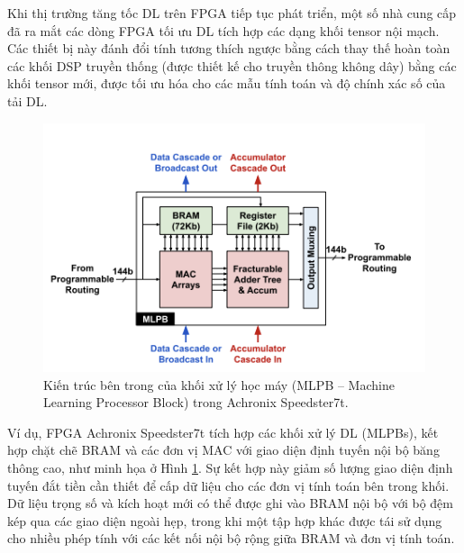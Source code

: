 \documentclass[a4paper]{article}
\begin{document}
Khi thị trường tăng tốc DL trên FPGA tiếp tục phát triển, một số nhà cung cấp đã ra mắt các dòng FPGA tối ưu DL tích hợp các dạng khối tensor nội mạch. Các thiết bị này đánh đổi tính tương thích ngược bằng cách thay thế hoàn toàn các khối DSP truyền thống (được thiết kế cho truyền thông không dây) bằng các khối tensor mới, được tối ưu hóa cho các mẫu tính toán và độ chính xác số của tải DL.

\begin{figure} [!h]
    \centering
    \includegraphics[width=0.75\linewidth]{assets/fpga_18.png}
    \caption{Kiến trúc bên trong của khối xử lý học máy (MLPB – Machine Learning Processor Block) trong Achronix Speedster7t.}
    \label{fig:fpga_18}
\end{figure}

Ví dụ, FPGA Achronix Speedster7t tích hợp các khối xử lý DL (MLPBs), kết hợp chặt chẽ BRAM và các đơn vị MAC với giao diện định tuyến nội bộ băng thông cao, như minh họa ở Hình \ref{fig:fpga_18}. Sự kết hợp này giảm số lượng giao diện định tuyến đắt tiền cần thiết để cấp dữ liệu cho các đơn vị tính toán bên trong khối. Dữ liệu trọng số và kích hoạt mới có thể được ghi vào BRAM nội bộ với bộ đệm kép qua các giao diện ngoài hẹp, trong khi một tập hợp khác được tái sử dụng cho nhiều phép tính với các kết nối nội bộ rộng giữa BRAM và đơn vị tính toán.
\end{document}
